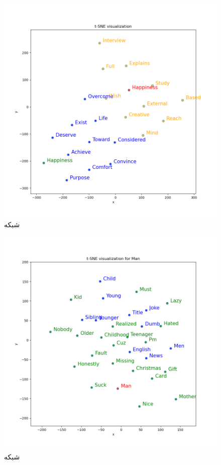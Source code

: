 \documentclass[10pt]{article}
\begin{document}
\begin{figure}[ht!]
		\centering\includegraphics[width=\linewidth]{../reports/word_vectors_common_happiness.png}
		\caption{شبکه 
			}
		\label{word2vec-1}
	\end{figure}

	\begin{figure}[ht!]
	\centering\includegraphics[width=\linewidth]{../reports/_word_vectors_common_man.png}
	\caption{شبکه 
		}
	\label{word2vec-2}
	\end{figure}
\fi
\newpage
\end{document}
